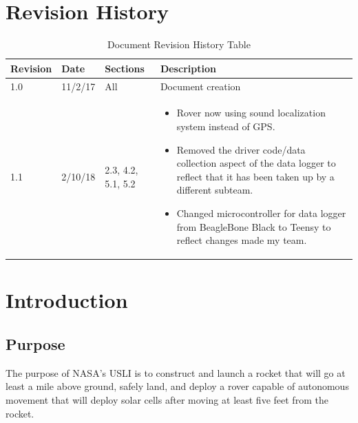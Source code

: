 \documentclass[onecolumn, draftclsnofoot, 10pt, compsoc]{IEEEtran}
\date{}
\begin{document}

\tableofcontents

\section{Revision History}
\begin{table}[h]
\centering
\caption{Document Revision History Table}
\label{table:Revision History}
\begin{tabular}{@{}lllp{12cm}@{}}
\toprule
\textbf{Revision}    & \textbf{Date}            & \textbf{Sections}  & \textbf{Description}                                                                                                                                             \\ \midrule
1.0                  & 11/2/17                  & All               & Document creation                                                                                                                                                \\ \midrule
1.1 & 2/10/18 & 2.3, 4.2, 5.1, 5.2 & \vspace{-15pt} \begin{itemize} \item Rover now using sound localization system instead of GPS. \item Removed the driver code/data collection aspect of the data logger to reflect that it has been taken up by a different subteam. \item Changed microcontroller for data logger from BeagleBone Black to Teensy to reflect changes made my team.\end{itemize} \vspace{-15pt} \\ \bottomrule
\end{tabular}
\end{table}

\section{Introduction}

\subsection{Purpose}
The purpose of NASA's USLI is to construct and launch a rocket that will go at least a mile above ground, safely land, and deploy a rover capable of autonomous movement that will deploy solar cells after moving at least five feet from the rocket.
\end{document}
